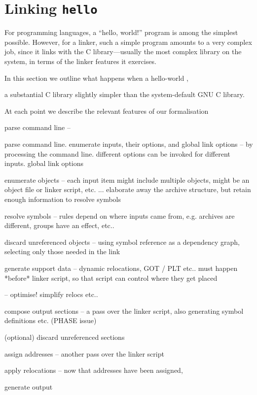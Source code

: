 \section{Linking \texttt{hello}}

For programming languages, a ``hello, world!'' program is among the simplest possible.
However, for a linker, such a simple program amounts to a very complex job,
since it links with the C library---usually the most complex library on the system,
in terms of the linker features it exercises.

In this section we outline what happens when a hello-world ,

a substantial C library slightly simpler than the system-default GNU C library.

At each point we describe the relevant features of our formalisation

parse command line -- 

parse command line. enumerate inputs, their options, and global link options -- 
    by processing the command line. different options can be invoked
    for different inputs.
    global link options

enumerate objects -- each input item might include multiple objects, 
     might be an object file or linker script, etc.
     ... elaborate away the archive structure, but retain enough information to resolve symbols

resolve symbols -- rules depend on where inputs came from, e.g. archives are different, 
    groups have an effect, etc..

discard unreferenced objects -- using symbol reference as a dependency graph, 
      selecting only those needed in the link

generate support data -- dynamic relocations, GOT / PLT etc.. must happen *before* linker script, 
       so that script can control where they get placed

   -- optimise! simplify relocs etc..

compose output sections -- a pass over the linker script, 
      also generating symbol definitions etc. (PHASE issue)

(optional) discard unreferenced sections

assign addresses -- another pass over the linker script

apply relocations -- now that addresses have been assigned, 

generate output
